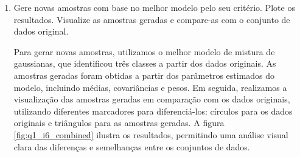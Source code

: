 \begin{enumerate}
    
    \newpage

    \item Gere novas amostras com base no melhor modelo pelo seu critério. Plote os resultados. Visualize as amostras geradas e compare-as com o conjunto de dados original.

    \begin{tcolorbox}[colback=white, colframe=black, title=Resposta:]
        Para gerar novas amostras, utilizamos o melhor modelo de mistura de gaussianas, que identificou três classes a partir dos dados originais. As amostras geradas foram obtidas a partir dos parâmetros estimados do modelo, incluindo médias, covariâncias e pesos. Em seguida, realizamos a visualização das amostras geradas em comparação com os dados originais, utilizando diferentes marcadores para diferenciá-los: círculos para os dados originais e triângulos para as amostras geradas. A figura \ref{fig:q1_i6_combined} ilustra os resultados, permitindo uma análise visual clara das diferenças e semelhanças entre os conjuntos de dados.
    \end{tcolorbox}


\end{enumerate}
